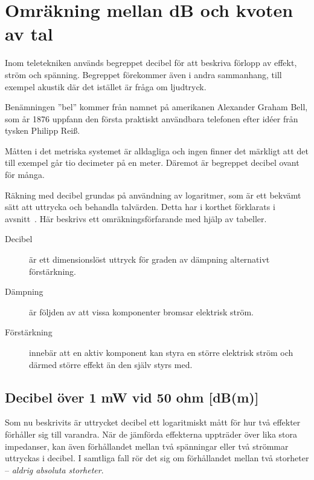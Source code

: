 \chapter{Omräkning mellan dB och kvoten av tal}
\label{ch:decibel2}

\noindent
Inom teletekniken används begreppet decibel för att beskriva förlopp
av effekt, ström och spänning. Begreppet förekommer även i andra
sammanhang, till exempel akustik där det istället är fråga om ljudtryck.

\begin{tcolorbox}[title=Historia]
Benämningen ''bel'' kommer från namnet på amerikanen Alexander Graham
Bell, som år 1876 uppfann den första praktiskt användbara telefonen
efter idéer från tysken Philipp Reiß.
\end{tcolorbox}

Måtten i det metriska systemet är alldagliga och ingen finner det märkligt att
det till exempel går tio decimeter på en meter.
Däremot är begreppet decibel ovant för många.

Räkning med decibel grundas på användning av logaritmer, som är ett
bekvämt sätt att uttrycka och behandla talvärden.
Detta har i korthet förklarats i avsnitt~.
Här beskrivs ett omräkningsförfarande med hjälp av tabeller.

\begin{description}
\item[Decibel] är ett dimensionslöst uttryck för graden av dämpning
  alternativt förstärkning.

\item[Dämpning] är följden av att vissa komponenter bromsar elektrisk
  ström.

\item[Förstärkning] innebär att en aktiv komponent kan styra en större
  elektrisk ström och därmed större effekt än den själv styrs med.
\end{description}

\section{Decibel över 1 mW vid 50 ohm [dB(m)]}

Som nu beskrivits är uttrycket decibel ett logaritmiskt mått för hur två
effekter förhåller sig till varandra.
När de jämförda effekterna uppträder över lika stora impedanser, kan även
förhållandet mellan två spänningar eller två strömmar uttryckas i decibel.
I samtliga fall rör det sig om förhållandet mellan två storheter --
\emph{aldrig absoluta storheter}.

